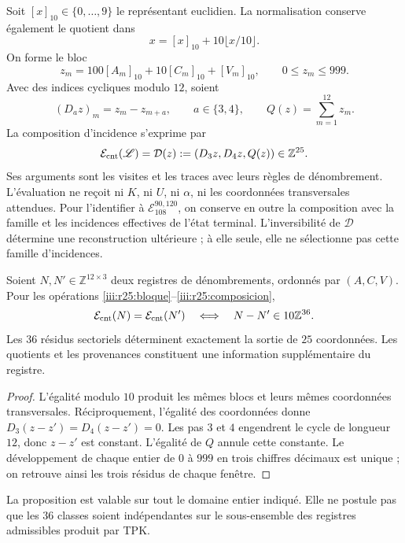 Soit $[x]_{10}\in\{0,\ldots,9\}$ le représentant euclidien.
La normalisation conserve également le quotient dans
\[
 x=[x]_{10}+10\lfloor x/10\rfloor.
\]
On forme le bloc
\begin{equation}
 z_m=100[A_m]_{10}+10[C_m]_{10}+[V_m]_{10},
 \qquad 0\leq z_m\leq999.
 \label{iii:r25:bloque}
\end{equation}
Avec des indices cycliques modulo $12$, soient
\[
 (D_a z)_m=z_m-z_{m+a},\qquad a\in\{3,4\},
 \qquad Q(z)=\sum_{m=1}^{12}z_m.
\]
La composition d’incidence s’exprime par
\begin{equation}
 \mathcal E_{\rm cnt}(\mathscr L)
 =\mathcal D(z):=(D_3z,D_4z,Q(z))\in\mathbb Z^{25}.
 \label{iii:r25:composicion}
\end{equation}
Ses arguments sont les visites et les traces avec leurs règles de dénombrement.
L’évaluation ne reçoit ni $K$, ni $U$, ni $\alpha$, ni les coordonnées
transversales attendues. Pour l’identifier à
$\mathcal E_{108}^{90,120}$, on conserve en outre la composition avec
la famille et les incidences effectives de l’état terminal.
L’inversibilité de $\mathcal D$ détermine une reconstruction ultérieure ;
à elle seule, elle ne sélectionne pas cette famille d’incidences.

\begin{proposition}
\label{iii:r25:residuos}
Soient $N,N'\in\mathbb Z^{12\times3}$ deux registres de dénombrements,
ordonnés par $(A,C,V)$. Pour les opérations
\eqref{iii:r25:bloque}--\eqref{iii:r25:composicion},
\[
 \mathcal E_{\rm cnt}(N)=\mathcal E_{\rm cnt}(N')
 \quad\Longleftrightarrow\quad N-N'\in10\mathbb Z^{36}.
\]
Les $36$ résidus sectoriels déterminent exactement la sortie de
$25$ coordonnées. Les quotients et les provenances constituent
une information supplémentaire du registre.
\end{proposition}
\begin{proof}
L’égalité modulo $10$ produit les mêmes blocs et leurs mêmes
coordonnées transversales. Réciproquement, l’égalité des
coordonnées donne $D_3(z-z')=D_4(z-z')=0$. Les pas $3$ et $4$
engendrent le cycle de longueur $12$, donc $z-z'$ est constant.
L’égalité de $Q$ annule cette constante. Le développement de chaque entier
de $0$ à $999$ en trois chiffres décimaux est unique ; on retrouve ainsi
les trois résidus de chaque fenêtre.
\end{proof}

La proposition est valable sur tout le domaine entier indiqué. Elle ne
postule pas que les $36$ classes soient indépendantes sur le sous-ensemble
des registres admissibles produit par TPK.

